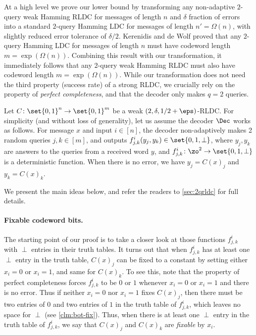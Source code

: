At a high level we prove our lower bound by transforming any non-adaptive $2$-query weak Hamming RLDC for messages of length $n$ and $\delta$ fraction of errors into a standard $2$-query Hamming LDC for messages of length $n'=\Omega(n)$, with slightly reduced error tolerance of $\delta/2$. Kerenidis and de Wolf \cite{KerenidisW04} proved that any $2$-query Hamming LDC for messages of length $n$ must have codeword length $m = \exp(\Omega(n))$. Combining this result with our transformation, it immediately follows that any $2$-query weak Hamming RLDC must also have codeword length $m = \exp(\Omega(n))$. While our transformation does not need the third property (success rate) of a strong RLDC, we crucially rely on the property of {\em perfect completeness}, and that the decoder only makes $q=2$ queries.
 
Let $C\colon\set{0,1}^n \rightarrow \set{0,1}^m$ be a weak $(2,\delta,1/2+\eps)$-RLDC. For simplicity (and without loss of generality), let us assume the decoder $\Dec$ works as follows. For message $x$ and input $i \in [n]$, the decoder non-adaptively makes 2 random queries $j ,k \in [m]$, and outputs $f_{j,k}^{i}(y_j, y_k) \in \set{0,1,\perp}$, where $y_j, y_k$ are answers to the queries from a received word $y$, and $f_{j,k}^{i} \colon \zo^2 \rightarrow \set{0,1,\perp}$ is a deterministic function. When there is no error, we have $y_j = C(x)_j$ and $y_k = C(x)_k$. 

We present the main ideas below, and refer the readers to \cref{sec:2qrldc} for full details.

\paragraph{Fixable codeword bits.} The starting point of our proof is to take a closer look at those functions $f_{j,k}^{i}$ with $\perp$ entries in their truth tables. It turns out that when $f_{j,k}^{i}$ has at least one $\perp$ entry in the truth table, $C(x)_j$ can be fixed to a constant by setting either $x_i=0$ or $x_i=1$, and same for $C(x)_k$. To see this, note that the property of perfect completeness forces $f_{j,k}^{i}$ to be $0$ or $1$ whenever $x_i=0$ or $x_i=1$ and there is no error. Thus if neither $x_i=0$ nor $x_i=1$ fixes $C(x)_j$, then there must be two entries of $0$ and two entries of $1$ in the truth table of $f_{j,k}^{i}$, which leaves no space for $\perp$ (see \cref{clm:bot-fix}). Thus, when there is at least one $\perp$ entry in the truth table of $f_{j,k}^{i}$, we say that $C(x)_j$ and $C(x)_k$ are \emph{fixable} by $x_i$.

